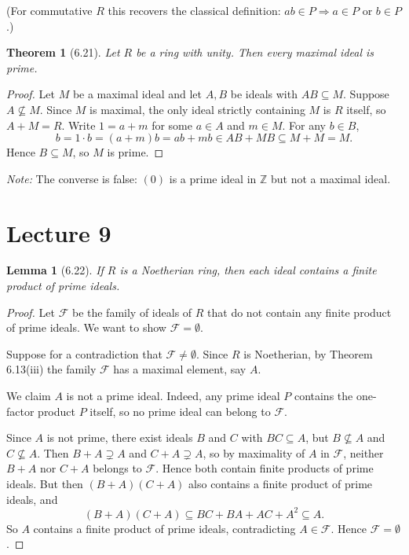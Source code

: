 \documentclass[12pt]{article}
\newtheorem{theorem}{Theorem}
\newtheorem{lemma}{Lemma}
\begin{document}
\noindent(For commutative $R$ this recovers the classical definition: $ab \in P \Rightarrow a \in P$ or $b \in P$.)

\begin{theorem}[6.21]
Let $R$ be a ring with unity. Then every maximal ideal is prime.
\end{theorem}

\begin{proof}
Let $M$ be a maximal ideal and let $A, B$ be ideals with $AB \subseteq M$. Suppose $A \not\subseteq M$. Since $M$ is maximal, the only ideal strictly containing $M$ is $R$ itself, so $A + M = R$. Write $1 = a + m$ for some $a \in A$ and $m \in M$. For any $b \in B$,
\[
  b = 1 \cdot b = (a + m)b = ab + mb \in AB + MB \subseteq M + M = M.
\]
Hence $B \subseteq M$, so $M$ is prime.
\end{proof}

\noindent\textit{Note:} The converse is false: $(0)$ is a prime ideal in $\mathbb{Z}$ but not a maximal ideal.

\section*{Lecture 9}

\begin{lemma}[6.22]
If $R$ is a Noetherian ring, then each ideal contains a finite product of prime ideals.
\end{lemma}

\begin{proof}
Let $\mathcal{F}$ be the family of ideals of $R$ that do not contain any finite product of prime ideals. We want to show $\mathcal{F} = \emptyset$.

Suppose for a contradiction that $\mathcal{F} \neq \emptyset$. Since $R$ is Noetherian, by Theorem 6.13(iii) the family $\mathcal{F}$ has a maximal element, say $A$.

We claim $A$ is not a prime ideal. Indeed, any prime ideal $P$ contains the one-factor product $P$ itself, so no prime ideal can belong to $\mathcal{F}$.

Since $A$ is not prime, there exist ideals $B$ and $C$ with $BC \subseteq A$, but $B \not\subseteq A$ and $C \not\subseteq A$. Then $B + A \supsetneq A$ and $C + A \supsetneq A$, so by maximality of $A$ in $\mathcal{F}$, neither $B + A$ nor $C + A$ belongs to $\mathcal{F}$. Hence both contain finite products of prime ideals. But then $(B+A)(C+A)$ also contains a finite product of prime ideals, and
\[
  (B+A)(C+A) \subseteq BC + BA + AC + A^2 \subseteq A.
\]
So $A$ contains a finite product of prime ideals, contradicting $A \in \mathcal{F}$. Hence $\mathcal{F} = \emptyset$.
\end{proof}
\end{document}

